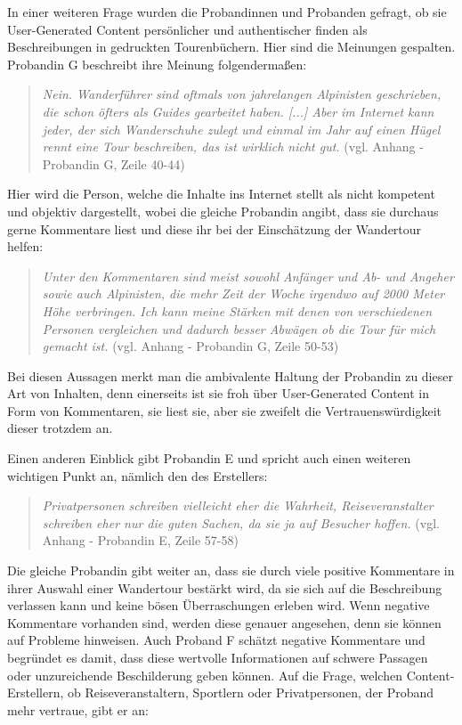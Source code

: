 In einer weiteren Frage wurden die Probandinnen und Probanden gefragt, ob sie User-Generated Content persönlicher und authentischer finden als Beschreibungen in gedruckten Tourenbüchern. Hier sind die Meinungen gespalten. Probandin G beschreibt ihre Meinung folgendermaßen:

\begin{quote}
	\textit{\glqq Nein. Wanderführer sind oftmals von jahrelangen Alpinisten geschrieben, die schon öfters als Guides gearbeitet haben. [...] Aber im Internet kann jeder, der sich Wanderschuhe zulegt und einmal im Jahr auf einen Hügel rennt eine Tour beschreiben, das ist wirklich nicht gut.\grqq} (vgl. Anhang - Probandin G, Zeile 40-44)
\end{quote}

Hier wird die Person, welche die Inhalte ins Internet stellt als nicht kompetent und objektiv dargestellt, wobei die gleiche Probandin angibt, dass sie durchaus gerne Kommentare liest und diese ihr bei der Einschätzung der Wandertour helfen:

\begin{quote}
	\textit{\glqq Unter den Kommentaren sind meist sowohl Anfänger und Ab- und Angeher sowie auch Alpinisten, die mehr Zeit der Woche irgendwo auf 2000 Meter Höhe verbringen. Ich kann meine Stärken mit denen von verschiedenen Personen vergleichen und dadurch besser Abwägen ob die Tour für mich gemacht ist.\grqq} (vgl. Anhang - Probandin G, Zeile 50-53)
\end{quote}

Bei diesen Aussagen merkt man die ambivalente Haltung der Probandin zu dieser Art von Inhalten, denn einerseits ist sie froh über User-Generated Content in Form von Kommentaren, sie liest sie, aber sie zweifelt die Vertrauenswürdigkeit dieser trotzdem an.

Einen anderen Einblick gibt Probandin E und spricht auch einen weiteren wichtigen Punkt an, nämlich den des Erstellers:

\begin{quote}
	\textit{\glqq Privatpersonen schreiben vielleicht eher die Wahrheit, Reiseveranstalter schreiben eher nur die guten Sachen, da sie ja auf Besucher hoffen.\grqq} (vgl. Anhang - Probandin E, Zeile 57-58)
\end{quote}

Die gleiche Probandin gibt weiter an, dass sie durch viele positive Kommentare in ihrer Auswahl einer Wandertour bestärkt wird, da sie sich auf die Beschreibung verlassen kann und keine bösen Überraschungen erleben wird. Wenn negative Kommentare vorhanden sind, werden diese genauer angesehen, denn sie können auf Probleme hinweisen. Auch Proband F schätzt negative Kommentare und begründet es damit, dass diese wertvolle Informationen auf schwere Passagen oder unzureichende Beschilderung geben können. Auf die Frage, welchen Content-Erstellern, ob Reiseveranstaltern, Sportlern oder Privatpersonen, der Proband mehr vertraue, gibt er an:

